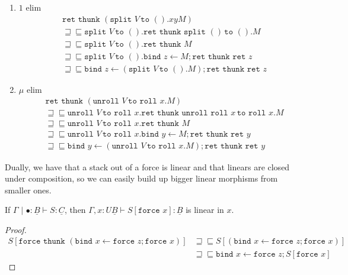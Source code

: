 \documentclass[acmsmall,nonacm]{acmart}
\renewcommand{\u}{\underline}
\newcommand{\pipe}{\,\,|\,\,}
\newcommand{\ltdyn}{\sqsubseteq}
\newcommand{\gtdyn}{\sqsupseteq}
\newcommand{\equidyn}{\mathrel{\gtdyn\ltdyn}}
\newcommand{\roll}{\kw{roll}}
\newcommand{\bindXtoYinZ}[2]{\kw{bind}#2 \leftarrow #1;}
\newcommand{\kw}[1]{\texttt{#1}\,\,}
\newcommand{\pmpairWtoXYinZ}[4]{\kw{split} #1\,\kw{to} (#2,#3). #4}
\newcommand{\pmpairWtoinZ}[2]{\kw{split} #1\,\kw{to} (). #2}
\newcommand{\pmmuXtoYinZ}[3]{\kw{unroll} #1 \,\kw{to} \roll #2. #3}
\newcommand{\ret}{\kw{ret}}
\newcommand{\thunk}{\kw{thunk}}
\newcommand{\force}{\kw{force}}
\begin{document}
{\begin{longonly}
\begin{longproof}
\begin{enumerate}
    \begin{align*}
      &\ret\thunk (\pmpairWtoXYinZ V x y M)\\
      &\equidyn \pmpairWtoXYinZ V x y \ret\thunk \pmpairWtoXYinZ {(x,y)} x y M\tag{$\times\eta$}\\
      &\equidyn \pmpairWtoXYinZ V x y \ret\thunk M\tag{$\times\beta$}\\
      &\equidyn \pmpairWtoXYinZ V x y \bindXtoYinZ M z \ret\thunk\ret z\tag{$M$ thunkable}\\
      &\equidyn \bindXtoYinZ {(\pmpairWtoXYinZ V x y M)} z \ret\thunk\ret z\tag{commuting conversion}
    \end{align*}
  \item $1$ elim
    \begin{align*}
      &\ret\thunk (\pmpairWtoinZ V x y M)\\
      &\equidyn \pmpairWtoinZ V \ret\thunk \pmpairWtoinZ {()} M\tag{$1\eta$}\\
      &\equidyn \pmpairWtoinZ V \ret\thunk M\tag{$1\beta$}\\
      &\equidyn \pmpairWtoinZ V \bindXtoYinZ M z \ret\thunk\ret z\tag{$M$ thunkable}\\
      &\equidyn \bindXtoYinZ {(\pmpairWtoinZ V M)} z \ret\thunk\ret z\tag{commuting conversion}
    \end{align*}  \item $\mu$ elim
    \begin{align*}
      &\ret\thunk (\pmmuXtoYinZ V x M)\\
      &\equidyn \pmmuXtoYinZ V x \ret\thunk \pmmuXtoYinZ {\roll x} x M\tag{$\mu\eta$}\\
      &\equidyn \pmmuXtoYinZ V x \ret\thunk M\tag{$\mu\beta$}\\
      &\equidyn \pmmuXtoYinZ V x \bindXtoYinZ M y \ret\thunk\ret y\tag{$M$ thunkable}\\
      &\equidyn \bindXtoYinZ {(\pmmuXtoYinZ V x M)} y \ret\thunk\ret y\tag{commuting conversion}
    \end{align*}
  \end{enumerate}
\end{longproof}

Dually, we have that a stack out of a force is linear and that linears
are closed under composition, so we can easily build up bigger linear
morphisms from smaller ones.
\begin{lemma}
  If $\Gamma \pipe \bullet : \u B \vdash S : \u C$, then
  $\Gamma , x : U\u B\vdash S[\force x] : \u B$ is linear in $x$.
\end{lemma}
\begin{proof}
  \begin{align*}
    S[\force \thunk {(\bindXtoYinZ {\force z} x \force x)}]
    &\equidyn
    S[{(\bindXtoYinZ {\force z} x \force x)}]\tag{$U\beta$}\\
    &\equidyn \bindXtoYinZ {\force z} x S[\force x] \tag{$\u F\eta$}
  \end{align*}
\end{proof}


\end{longonly}}
\end{document}
